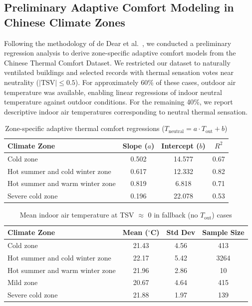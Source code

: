 \documentclass[final,3p,times,12pt]{elsarticle}
\begin{document}
\subsection{Preliminary Adaptive Comfort Modeling in Chinese Climate Zones}

Following the methodology of de Dear et al.~\cite{dedearDevelopingAdaptiveModel1998}, we conducted a preliminary regression analysis to derive zone-specific adaptive comfort models from the Chinese Thermal Comfort Dataset. We restricted our dataset to naturally ventilated buildings and selected records with thermal sensation votes near neutrality ($|\mathrm{TSV}| \leq 0.5$). For approximately 60\% of these cases, outdoor air temperature was available, enabling linear regressions of indoor neutral temperature against outdoor conditions. For the remaining 40\%, we report descriptive indoor air temperatures corresponding to neutral thermal sensation.

\begin{table}[h!]
\centering
\caption{Zone-specific adaptive thermal comfort regressions ($T_{\text{neutral}} = a \cdot T_{\text{out}} + b$)}
\label{tab:adaptive-regression}
\begin{tabular}{lccc}
\toprule
\textbf{Climate Zone} & \textbf{Slope ($a$)} & \textbf{Intercept ($b$)} & \textbf{$R^2$} \\
\midrule
Cold zone & 0.502 & 14.577 & 0.67 \\
Hot summer and cold winter zone & 0.617 & 12.332 & 0.82 \\
Hot summer and warm winter zone & 0.819 & 6.818 & 0.71 \\
Severe cold zone & 0.196 & 22.078 & 0.53 \\
\bottomrule
\end{tabular}
\end{table}

\begin{table}[h!]
\centering
\caption{Mean indoor air temperature at TSV $\approx$ 0 in fallback (no $T_{\text{out}}$) cases}
\label{tab:neutral-fallback}
\begin{tabular}{lccc}
\toprule
\textbf{Climate Zone} & \textbf{Mean ($^\circ$C)} & \textbf{Std Dev} & \textbf{Sample Size} \\
\midrule
Cold zone & 21.43 & 4.56 & 413 \\
Hot summer and cold winter zone & 22.17 & 5.42 & 3264 \\
Hot summer and warm winter zone & 21.96 & 2.86 & 10 \\
Mild zone & 20.67 & 4.64 & 415 \\
Severe cold zone & 21.88 & 1.97 & 139 \\
\bottomrule
\end{tabular}
\end{table}
\end{document}
